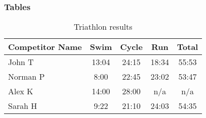 \label{tables}
\begin{frame}\frametitle{Tables}
  \begin{table}
    \begin{tabular}{l | c | c | c | c }
      Competitor Name & Swim & Cycle & Run & Total \\
      \hline \hline
      John T & 13:04 & 24:15 & 18:34 & 55:53 \\ 
      Norman P & 8:00 & 22:45 & 23:02 & 53:47\\
      Alex K & 14:00 & 28:00 & n/a & n/a\\
      Sarah H & 9:22 & 21:10 & 24:03 & 54:35 
    \end{tabular}
    \caption{Triathlon results}
  \end{table}
\end{frame}